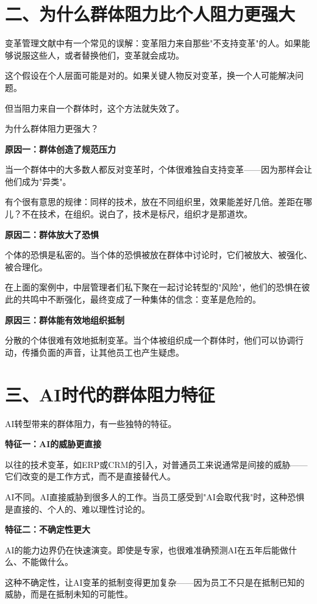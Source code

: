 \section{二、为什么群体阻力比个人阻力更强大}


变革管理文献中有一个常见的误解：变革阻力来自那些"不支持变革"的人。如果能够说服这些人，或者替换他们，变革就会成功。

这个假设在个人层面可能是对的。如果关键人物反对变革，换一个人可能解决问题。

但当阻力来自一个群体时，这个方法就失效了。

为什么群体阻力更强大？

\textbf{原因一：群体创造了规范压力}

当一个群体中的大多数人都反对变革时，个体很难独自支持变革——因为那样会让他们成为"异类"。

有个很有意思的规律：同样的技术，放在不同组织里，效果能差好几倍。差距在哪儿？不在技术，在组织。说白了，技术是标尺，组织才是那道坎。

\textbf{原因二：群体放大了恐惧}

个体的恐惧是私密的。当个体的恐惧被放在群体中讨论时，它们被放大、被强化、被合理化。

在上面的案例中，中层管理者们私下聚在一起讨论转型的"风险"，他们的恐惧在彼此的共鸣中不断强化，最终变成了一种集体的信念：变革是危险的。

\textbf{原因三：群体能有效地组织抵制}

分散的个体很难有效地抵制变革。当个体被组织成一个群体时，他们可以协调行动，传播负面的声音，让其他员工也产生疑虑。

\section{三、AI时代的群体阻力特征}


AI转型带来的群体阻力，有一些独特的特征。

\textbf{特征一：AI的威胁更直接}

以往的技术变革，如ERP或CRM的引入，对普通员工来说通常是间接的威胁——它们改变的是工作方式，而不是直接替代人。

AI不同。AI直接威胁到很多人的工作。当员工感受到"AI会取代我"时，这种恐惧是直接的、个人的、难以理性讨论的。

\textbf{特征二：不确定性更大}

AI的能力边界仍在快速演变。即使是专家，也很难准确预测AI在五年后能做什么、不能做什么。

这种不确定性，让AI变革的抵制变得更加复杂——因为员工不只是在抵制已知的威胁，而是在抵制未知的可能性。

